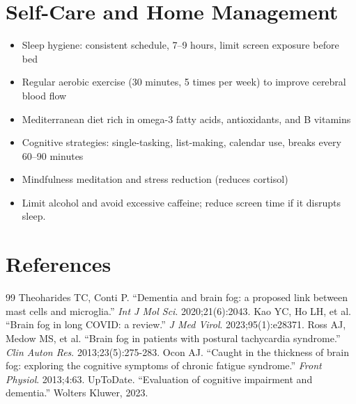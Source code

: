 \section*{Self-Care and Home Management}
\begin{itemize}
 \item Sleep hygiene: consistent schedule, 7--9 hours, limit screen exposure before bed
 \item Regular aerobic exercise (30 minutes, 5 times per week) to improve cerebral blood flow
 \item Mediterranean diet rich in omega-3 fatty acids, antioxidants, and B vitamins
 \item Cognitive strategies: single-tasking, list-making, calendar use, breaks every 60--90 minutes
 \item Mindfulness meditation and stress reduction (reduces cortisol)
 \item Limit alcohol and avoid excessive caffeine; reduce screen time if it disrupts sleep.
\end{itemize}

\section*{References}
\begin{thebibliography}{99}
 Theoharides TC, Conti P. ``Dementia and brain fog: a proposed link between mast cells and microglia.'' \textit{Int J Mol Sci}. 2020;21(6):2043.
 Kao YC, Ho LH, et al. ``Brain fog in long COVID: a review.'' \textit{J Med Virol}. 2023;95(1):e28371.
 Ross AJ, Medow MS, et al. ``Brain fog in patients with postural tachycardia syndrome.'' \textit{Clin Auton Res}. 2013;23(5):275-283.
 Ocon AJ. ``Caught in the thickness of brain fog: exploring the cognitive symptoms of chronic fatigue syndrome.'' \textit{Front Physiol}. 2013;4:63.
 UpToDate. ``Evaluation of cognitive impairment and dementia.'' Wolters Kluwer, 2023.
\end{thebibliography}
